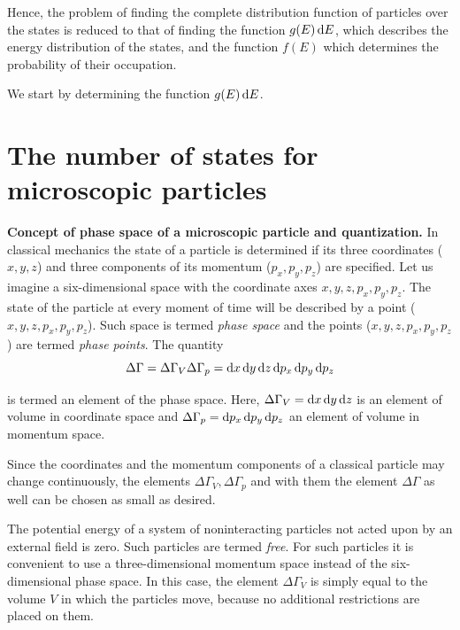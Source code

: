 Hence, the problem of finding the complete distribution function of particles over the states is reduced to that of finding the function $g(E)\,\mathrm{d} E$, which describes the energy distribution of the states, and the function $f(E)$ which determines the probability of their occupation.

We start by determining the function $g(E)\,\mathrm{d} E$.

\section{The number of states for microscopic particles}\label{sec:25}

\textbf{Concept of phase space of a microscopic particle and quantization.} In classical mechanics the state of a particle is determined if its three coordinates ($x, y, z$) and three components of its momentum ($p_x, p_y, p_z$) are specified. Let us imagine a six-dimensional space with the coordinate axes $x, y, z, p_x, p_y, p_z$. The state of the particle at every moment of time will be described by a point ($x, y, z, p_x, p_y, p_z$). Such space is termed \textit{phase space} and the points ($x, y, z, p_x, p_y, p_z$) are termed \textit{phase points}. The quantity
\begin{equation}\label{eq:3_14}
    \Delta{\Gamma} = \Delta{\Gamma}_V \Delta{\Gamma}_p = \mathrm{d} x\,\mathrm{d} y\,\mathrm{d} z\, \mathrm{d} p_x\,\mathrm{d} p_y\,\mathrm{d} p_z
\end{equation}

\noindent
is termed an element of the phase space. Here, $\Delta{\Gamma}_V=\mathrm{d} x\,\mathrm{d} y\,\mathrm{d} z$ is an element of volume in coordinate space and $\Delta{\Gamma}_p=\mathrm{d} p_x\,\mathrm{d} p_y\,\mathrm{d} p_z$ an element of volume in momentum space.

Since the coordinates and the momentum components of a classical particle may change continuously, the elements $\Delta{\Gamma}_V, \Delta{\Gamma}_p$ and with them the element $\Delta{\Gamma}$ as well can be chosen as small as desired.

The potential energy of a system of noninteracting particles not acted upon by an external field is zero. Such particles are termed \textit{free}. For such particles it is convenient to use a three-dimensional momentum space instead of the six-dimensional phase space. In this case, the element $\Delta{\Gamma}_V$ is simply equal to the volume $V$ in which the particles move, because no additional restrictions are placed on them.

